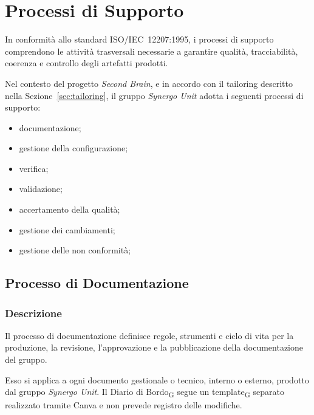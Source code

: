 
\section{Processi di Supporto}
\label{sec:processi-supporto}

In conformità allo standard ISO/IEC~12207:1995, i processi di
supporto comprendono le attività trasversali necessarie a garantire qualità,
tracciabilità, coerenza e controllo degli artefatti prodotti.

Nel contesto del progetto \textit{Second Brain}, e in accordo con il tailoring
descritto nella Sezione~\ref{sec:tailoring}, il gruppo \textit{Synergo Unit} adotta
i seguenti processi di supporto:

\begin{itemize}
    \item documentazione;
    \item gestione della configurazione;
    \item verifica;
    \item validazione;
    \item accertamento della qualità;
    \item gestione dei cambiamenti;
    \item gestione delle non conformità;
\end{itemize}


\subsection{Processo di Documentazione}
\label{sec:documentazione}

\subsubsection{Descrizione}

Il processo di documentazione definisce regole, strumenti e ciclo di vita per la
produzione, la revisione, l'approvazione e la pubblicazione della documentazione
del gruppo.

Esso si applica a ogni documento gestionale o tecnico, interno o esterno, prodotto
dal gruppo \textit{Synergo Unit}. Il Diario di Bordo\textsubscript{G} segue un template\textsubscript{G} separato
realizzato tramite Canva e non prevede registro delle modifiche.

